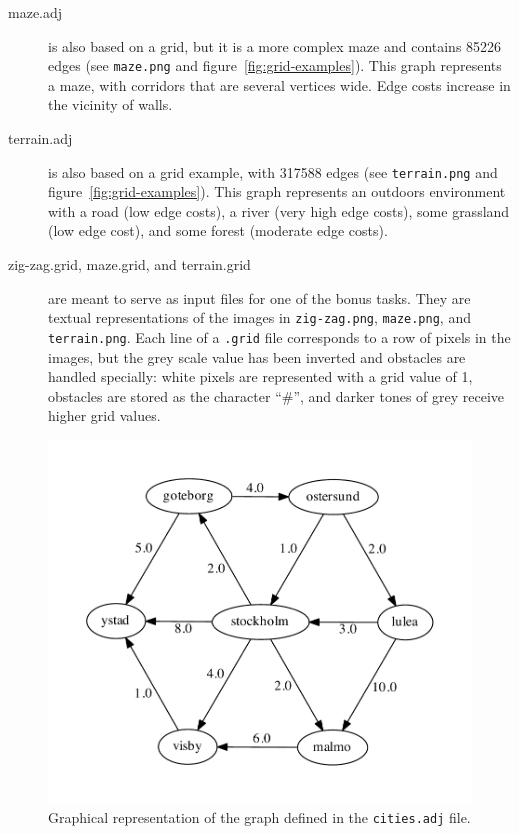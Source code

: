 \documentclass[a4paper,10pt]{article}
\begin{document}
\begin{description}
\item[maze.adj]
  is also based on a grid, but it is a more complex maze and contains 85226 edges (see \texttt{maze.png} and figure~\ref{fig:grid-examples}).
  This graph represents a maze, with corridors that are several vertices wide.
  Edge costs increase in the vicinity of walls.

\item[terrain.adj]
  is also based on a grid example, with 317588 edges (see \texttt{terrain.png} and figure~\ref{fig:grid-examples}).
  This graph represents an outdoors environment with a road (low edge costs), a river (very high edge costs), some grassland (low edge cost), and some forest (moderate edge costs).
  
\item[zig-zag.grid, maze.grid, and terrain.grid]
  are meant to serve as input files for one of the bonus tasks.
  They are textual representations of the images in \texttt{zig-zag.png}, \texttt{maze.png}, and \texttt{terrain.png}.
  Each line of a \texttt{.grid} file corresponds to a row of pixels in the images, but the grey scale value has been inverted and obstacles are handled specially:
  white pixels are represented with a grid value of 1, obstacles are stored as the character ``\#'', and darker tones of grey receive higher grid values.
  
\end{description}

\begin{figure}
  \centering
  \includegraphics[width=0.6\columnwidth]{cities.pdf}
  \caption{
    Graphical representation of the graph defined in the \texttt{cities.adj} file.
  }\label{fig:cities}
\end{figure}
\end{document}
